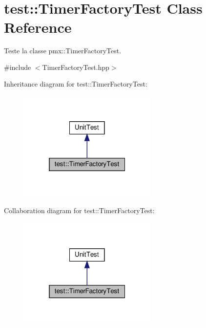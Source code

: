 \hypertarget{classtest_1_1TimerFactoryTest}{}\section{test\+:\+:Timer\+Factory\+Test Class Reference}
\label{classtest_1_1TimerFactoryTest}


Teste la classe pmx\+::\+Timer\+Factory\+Test.  




{\ttfamily \#include $<$Timer\+Factory\+Test.\+hpp$>$}



Inheritance diagram for test\+:\+:Timer\+Factory\+Test\+:
\nopagebreak
\begin{figure}[H]
\begin{center}
\leavevmode
\includegraphics[width=196pt]{classtest_1_1TimerFactoryTest__inherit__graph}
\end{center}
\end{figure}


Collaboration diagram for test\+:\+:Timer\+Factory\+Test\+:
\nopagebreak
\begin{figure}[H]
\begin{center}
\leavevmode
\includegraphics[width=196pt]{classtest_1_1TimerFactoryTest__coll__graph}
\end{center}
\end{figure}
